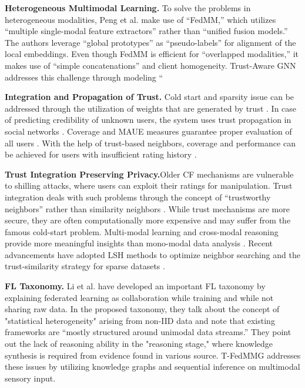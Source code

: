 \documentclass[journal]{IEEEtran} %
\begin{document}
\vspace{0.5em}
\noindent\textbf{Heterogeneous Multimodal Learning.} To solve the problems in heterogeneous modalities, Peng et al.\cite{b2} make use of “FedMM,” which utilizes “multiple single-modal feature extractors” rather than “unified fusion models.” The authors leverage “global prototypes” as “pseudo-labels” for alignment of the local embeddings\cite{b2}. Even though FedMM is efficient for “overlapped modalities,” it makes use of “simple concatenations” and client homogeneity\cite{b2}. Trust-Aware GNN addresses this challenge through modeling “

\vspace{0.5em}
\noindent\textbf{Integration and Propagation of Trust.} Cold start and sparsity issue can be addressed through the utilization of weights that are generated by trust \cite{b3}. In case of predicting credibility of unknown users, the system uses trust propagation in social networks \cite{b3}. Coverage and MAUE measures guarantee proper evaluation of all users \cite{b3}.
With the help of trust-based neighbors, coverage and performance can be achieved for users with insufficient rating history \cite{b3}.

\vspace{0.5em}
\noindent\textbf{Trust Integration Preserving Privacy.}Older CF mechanisms are vulnerable to shilling attacks, where users can exploit their ratings for manipulation. Trust integration deals with such problems through the concept of “trustworthy neighbors” rather than similarity neighbors \cite{b4}. While trust mechanisms are more secure, they are often computationally more expensive and may suffer from the famous cold-start problem. Multi-modal learning and cross-modal reasoning provide more meaningful insights than mono-modal data analysis \cite{b4}. Recent advancements have adopted 
LSH methods to optimize neighbor searching and the trust-similarity strategy for sparse datasets \cite{b4}.

\vspace{0.5em}
\noindent\textbf{FL Taxonomy.} Li et al. \cite{b5} have developed an important FL taxonomy by explaining federated learning as collaboration while training and  while not sharing raw data. In the proposed taxonomy, they talk about the concept of "statistical heterogeneity" arising from non-IID data and note that existing frameworks are “mostly structured around unimodal data streams.”\cite{b5} They point out the lack of reasoning ability in the "reasoning stage," where knowledge synthesis is required from evidence found in various source. T-FedMMG addresses these issues by utilizing knowledge graphs and sequential inference on multimodal sensory input.
\end{document}
